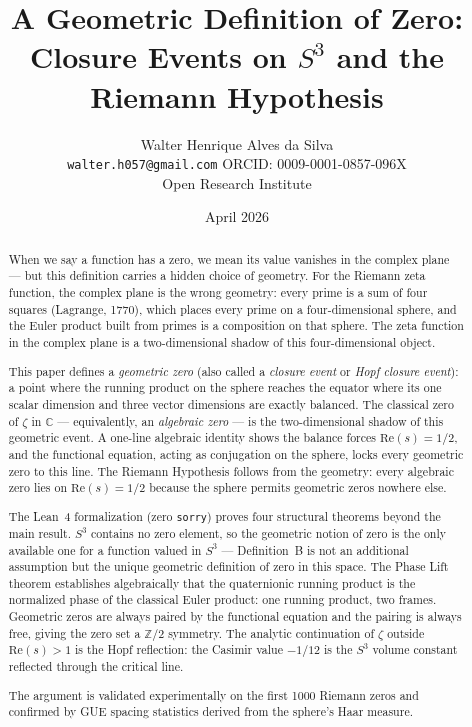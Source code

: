 \documentclass[12pt,a4paper]{article}
\title{A Geometric Definition of Zero:\\
Closure Events on $S^3$ and the Riemann Hypothesis}
\author{
Walter Henrique Alves da Silva\\
\texttt{walter.h057@gmail.com}\quad
ORCID: 0009-0001-0857-096X\\[4pt]
Open Research Institute
}
\date{April 2026}
\theoremstyle{definition}
\theoremstyle{remark}
\begin{document}
\maketitle

\begin{abstract}
When we say a function has a zero, we mean its value vanishes in the complex
plane --- but this definition carries a hidden choice of geometry. For the
Riemann zeta function, the complex plane is the wrong geometry: every prime
is a sum of four squares (Lagrange, 1770), which places every prime on a
four-dimensional sphere, and the Euler product built from primes is a
composition on that sphere. The zeta function in the complex plane is a
two-dimensional shadow of this four-dimensional object.

This paper defines a \emph{geometric zero} (also called a \emph{closure
event} or \emph{Hopf closure event}): a point where the running product on the
sphere reaches the equator where its one scalar dimension and three vector
dimensions are exactly balanced. The classical zero of $\zeta$ in $\mathbb{C}$
--- equivalently, an \emph{algebraic zero} --- is the two-dimensional shadow
of this geometric event. A one-line algebraic identity shows the balance forces
$\mathrm{Re}(s) = 1/2$, and the functional equation, acting as conjugation on
the sphere, locks every geometric zero to this line. The Riemann Hypothesis
follows from the geometry: every algebraic zero lies on $\mathrm{Re}(s) = 1/2$
because the sphere permits geometric zeros nowhere else.

The Lean~4 formalization (zero \texttt{sorry}) proves four structural theorems
beyond the main result. $S^3$ contains no zero element, so the geometric notion
of zero is the only available one for a function valued in $S^3$ --- Definition~B
is not an additional assumption but the unique geometric definition of zero in
this space. The Phase Lift theorem establishes algebraically that the
quaternionic running product is the normalized phase of the classical Euler
product: one running product, two frames. Geometric zeros are always paired by
the functional equation and the pairing is always free, giving the zero set a
$\mathbb{Z}/2$ symmetry. The analytic continuation of $\zeta$ outside
$\mathrm{Re}(s)>1$ is the Hopf reflection: the Casimir value $-1/12$ is the
$S^3$ volume constant reflected through the critical line.

The argument is validated experimentally on the first 1000 Riemann zeros and
confirmed by GUE spacing statistics derived from the sphere's Haar measure.
\end{abstract}
\end{document}
